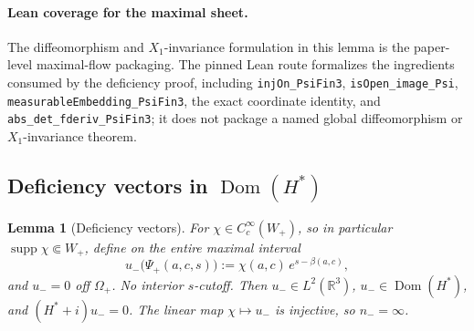 ﻿\documentclass[11pt]{article}
\newtheorem{lemma}{Lemma}
\begin{document}
\paragraph{Lean coverage for the maximal sheet.}
The diffeomorphism and \(X_1\)-invariance formulation in this lemma is the
paper-level maximal-flow packaging. The pinned Lean route formalizes the
ingredients consumed by the deficiency proof, including
\texttt{injOn\_PsiFin3}, \texttt{isOpen\_image\_Psi},
\texttt{measurableEmbedding\_PsiFin3}, the exact coordinate identity, and
\texttt{abs\_det\_fderiv\_PsiFin3}; it does not package a named global
diffeomorphism or \(X_1\)-invariance theorem.

\subsection{Deficiency vectors in
\texorpdfstring{\(\operatorname{Dom}(H^*)\)}{Dom(H*)}}
\begin{lemma}[Deficiency vectors]
For \(\chi\in C_c^\infty(W_+)\), so in particular
\(\operatorname{supp}\chi\Subset W_+\), define on the entire maximal interval
\[
u_-\bigl(\Psi_+(a,c,s)\bigr)
:=\chi(a,c)\,e^{s-\beta(a,c)},
\]
and \(u_-=0\) off \(\Omega_+\). No interior \(s\)-cutoff. Then \(u_-\in L^2(\mathbb{R}^3)\), \(u_-\in\operatorname{Dom}(H^*)\), and \((H^*+i)u_-=0\). The linear map \(\chi\mapsto u_-\) is injective, so \(n_-=\infty\).
\end{lemma}
\end{document}
